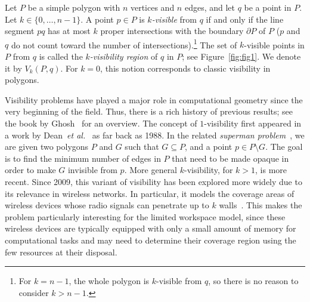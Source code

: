\documentclass[11pt, a4paper]{article}
\newcommand{\etal}{\emph{et al.}\xspace}
\begin{document}
Let $P$ be a simple polygon with $n$ vertices and $n$ edges,
and let $q$ be a point in $P$. Let
$k \in \{0, \dots, n - 1\}$.
A point $p \in P$ is \emph{$k$-visible} from $q$ 
if and only if the line segment $pq$ has at most 
$k$ proper intersections with the boundary 
$\partial P$ of $P$ ($p$ and $q$ do not count toward
the number of intersections).\footnote{For $k = n - 1$, the
whole polygon is $k$-visible from $q$, so there is no
reason to consider $k > n - 1$.} The set of $k$-visible 
points in $P$ from $q$ is called the 
\emph{$k$-visibility region} of $q$ in $P$;
see Figure~\ref{fig:fig1}.
We denote it by $V_ k(P,q)$. For $k = 0$, this 
notion corresponds to classic visibility in polygons. 

Visibility problems have played a major role 
in computational geometry since the very beginning
of the field. 
Thus, there is a rich history of previous results;
see the book by Ghosh~\cite{ghosh2007visibility} for 
an overview. The concept of $1$-visibility first appeared 
in a work by Dean~\etal~\cite{dean1988recognizing} as far
back as 1988. In the related 
\emph{superman problem}~\cite{MouawadSh94}, we are
given two polygons $P$ and $G$ such that
$G \subseteq P$, and a point $p \in P \setminus G$. 
The goal is to find the minimum
number of edges in $P$ that need to be made opaque in
order to make $G$ invisible from $p$. 
More general $k$-visibility, for $k > 1$,
is more recent. Since 2009, this variant of visibility has been
explored more widely due to its relevance in wireless networks. 
In particular, it 
models the coverage 
areas of wireless devices whose radio signals can penetrate 
up to $k$ walls~\cite{aichholzer2009modem,fabila2009modem}. 
This makes the problem particularly interesting for the 
limited workspace model, since these wireless devices are typically 
equipped with only a small amount of memory for computational tasks 
and may need to determine their coverage region using the 
few resources at their disposal.
\end{document}
